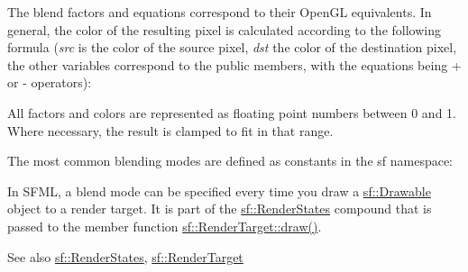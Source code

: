 The blend factors and equations correspond to their Open\+GL equivalents. In general, the color of the resulting pixel is calculated according to the following formula ({\itshape src} is the color of the source pixel, {\itshape dst} the color of the destination pixel, the other variables correspond to the public members, with the equations being + or -\/ operators)\+: 
\begin{DoxyCode}{0}
\end{DoxyCode}
 All factors and colors are represented as floating point numbers between 0 and 1. Where necessary, the result is clamped to fit in that range.

The most common blending modes are defined as constants in the sf namespace\+:


\begin{DoxyCode}{0}
\end{DoxyCode}


In S\+F\+ML, a blend mode can be specified every time you draw a \mbox{\hyperlink{classsf_1_1_drawable}{sf\+::\+Drawable}} object to a render target. It is part of the \mbox{\hyperlink{classsf_1_1_render_states}{sf\+::\+Render\+States}} compound that is passed to the member function \mbox{\hyperlink{classsf_1_1_render_target_a12417a3bcc245c41d957b29583556f39}{sf\+::\+Render\+Target\+::draw()}}.

\begin{DoxySeeAlso}{See also}
\mbox{\hyperlink{classsf_1_1_render_states}{sf\+::\+Render\+States}}, \mbox{\hyperlink{classsf_1_1_render_target}{sf\+::\+Render\+Target}} \begin{DoxyVerb}\end{DoxyVerb}
 
\end{DoxySeeAlso}


